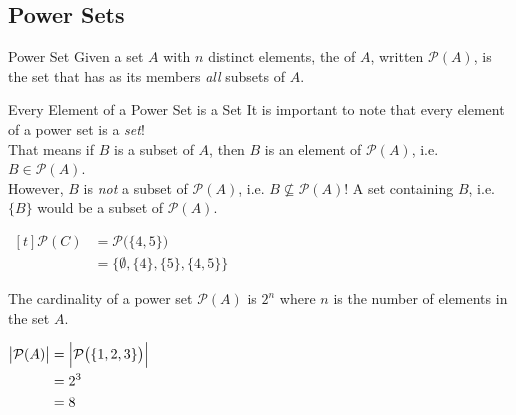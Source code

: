 \documentclass[../notes.tex]{subfiles}
\begin{document}
			\subsection{Power Sets}
				\begin{definition}{Power Set}
					Given a set $A$ with $n$ distinct elements, the  of $A$, written $\mathcal{P}(A)$, is the set that has as its members \emph{all} subsets of $A$.
				\end{definition}
				\nopagebreak
				\begin{sidenote}{Every Element of a Power Set is a Set}
					It is important to note that every element of a power set is a \emph{set}!\\ That means if $B$ is a subset of $A$, then $B$ is an element of $\mathcal{P}(A)$, i.e. $B \in \mathcal{P}(A)$.\\
					However, $B$ is \emph{not} a subset of $\mathcal{P}(A)$, i.e. $B \nsubseteq \mathcal{P}(A)$! A set containing $B$, i.e. $\{B\}$ would be a subset of $\mathcal{P}(A)$.
				\end{sidenote}
				\nopagebreak
				\begin{example}[hbox] $
					\begin{aligned}[t]
						\mathcal{P}(C) &= \mathcal{P}\bigl(\{4, 5\}\bigr)\\
						&= \bigl\{\emptyset, \{4\}, \{5\}, \{4, 5\}\bigr\}
					\end{aligned} $
				\end{example}
				The cardinality of a power set $\mathcal{P}(A)$ is $2^{n}$ where $n$ is the number of elements in the set $A$.
				\begin{example}[hbox] $
					\begin{aligned}[t]
						\bigl\lvert \mathcal{P}(A)\bigr\rvert &= \Bigl\lvert\mathcal{P}\bigl(\{1, 2, 3\}\bigr)\Bigr\rvert\\
						&= 2^{3}\\
						&= 8
					\end{aligned} $
				\end{example}
			\pagebreak
\end{document}
